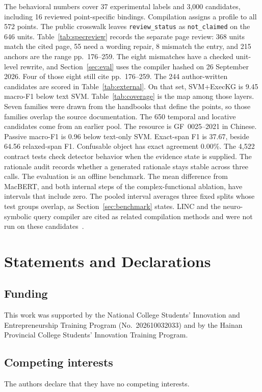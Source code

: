 \documentclass[pdflatex,sn-mathphys,NameDate]{sn-jnl}
\begin{document}
The behavioral numbers cover 37 experimental labels and 3,000 candidates, including 16 reviewed point-specific bindings.
Compilation assigns a profile to all 572 points.
The public crosswalk leaves \texttt{review\_status} as \texttt{not\_claimed} on the 646 units.
Table~\ref{tab:specreview} records the separate page review: 368 units match the cited page, 55 need a wording repair, 8 mismatch the entry, and 215 anchors are the range pp.~176--259.
The eight mismatches have a checked unit-level rewrite, and Section~\ref{sec:eval} uses the compiler hashed on 26 September 2026.
Four of those eight still cite pp.~176--259.
The 244 author-written candidates are scored in Table~\ref{tab:external}.
On that set, SVM+ExecKG is 9.45 macro-F1 below text SVM.
Table~\ref{tab:coverage} is the map among those layers.
Seven families were drawn from the handbooks that define the points, so those families overlap the source documentation.
The 650 temporal and locative candidates come from an earlier pool.
The resource is GF~0025--2021 in Chinese.
Passive macro-F1 is 0.96 below text-only SVM.
Exact-span F1 is 37.67, beside 64.56 relaxed-span F1.
Confusable object has exact agreement 0.00\%.
The 4,522 contract tests check detector behavior when the evidence state is supplied.
The rationale audit records whether a generated rationale stays stable across three calls.
The evaluation is an offline benchmark.
The mean difference from MacBERT, and both internal steps of the complex-functional ablation, have intervals that include zero.
The pooled interval averages three fixed splits whose test groups overlap, as Section~\ref{sec:benchmark} states.
LINC and the neuro-symbolic query compiler are cited as related compilation methods and were not run on these candidates~\citep{olausson2023linc,zhang2025qcompiler}.

\section*{Statements and Declarations}

\subsection*{Funding}
This work was supported by the National College Students' Innovation and Entrepreneurship Training Program (No.~202610032033) and by the Hainan Provincial College Students' Innovation Training Program.

\subsection*{Competing interests}
The authors declare that they have no competing interests.
\end{document}
